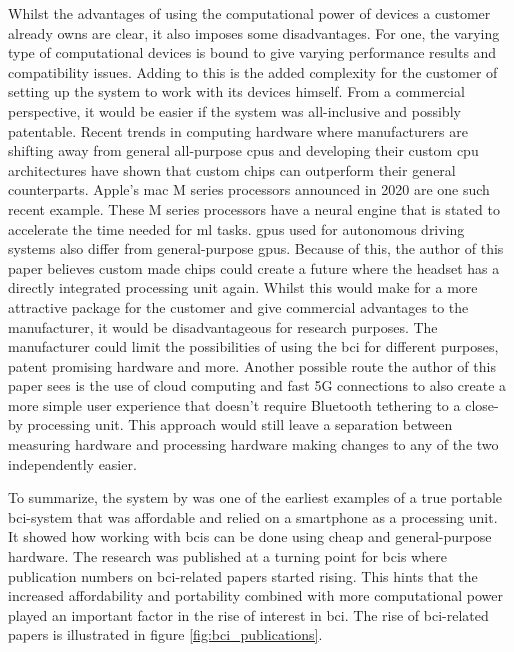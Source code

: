 Whilst the advantages of using the computational power of devices a customer already owns are clear, it also imposes some disadvantages.
For one, the varying type of computational devices is bound to give varying performance results and compatibility issues.
Adding to this is the added complexity for the customer of setting up the system to work with its devices himself.
From a commercial perspective, it would be easier if the system was all-inclusive and possibly patentable. 
Recent trends in computing hardware where manufacturers are shifting away from general all-purpose \glspl{cpu} and developing their custom \gls{cpu} architectures have shown that custom chips can outperform their general counterparts.
Apple's mac M series processors announced in 2020 are one such recent example.
These M series processors have a neural engine that is stated to accelerate the time needed for \gls{ml} tasks.
\glspl{gpu} used for autonomous driving systems also differ from general-purpose \glspl{gpu}.
Because of this, the author of this paper believes custom made chips could create a future where the headset has a directly integrated processing unit again.
Whilst this would make for a more attractive package for the customer and give commercial advantages to the manufacturer, it would be disadvantageous for research purposes.
The manufacturer could limit the possibilities of using the \gls{bci} for different purposes, patent promising hardware and more.
Another possible route the author of this paper sees is the use of cloud computing and fast 5G connections to also create a more simple user experience that doesn't require Bluetooth tethering to a close-by processing unit.
This approach would still leave a separation between measuring hardware and processing hardware making changes to any of the two independently easier.

To summarize, the system by \citet{early_bci_phone} was one of the earliest examples of a true portable \gls{bci}-system that was affordable and relied on a smartphone as a processing unit.
It showed how working with \glspl{bci} can be done using cheap and general-purpose hardware.
The research was published at a turning point for \glspl{bci} where publication numbers on \gls{bci}-related papers started rising.
This hints that the increased affordability and portability combined with more computational power played an important factor in the rise of interest in \gls{bci}. 
The rise of \gls{bci}-related papers is illustrated in figure \ref{fig:bci_publications}.

